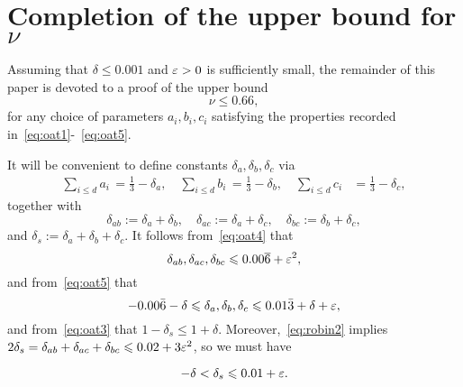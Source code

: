 \section{Completion of the upper bound for \texorpdfstring{$\nu$}{nu}}

Assuming that
 $\delta\leq 0.001$ and
$\varepsilon>0$ is sufficiently small,
the remainder of this paper is devoted to a proof of the upper bound
\[\nu \le 0.66,
\]
for any choice of parameters $a_i,b_i ,c_i$ satisfying the properties recorded in~\eqref{eq:oat1}-~\eqref{eq:oat5}.


It will be convenient to define constants $\delta_a,\delta_b,\delta_c$ via
\begin{align}\label{eq:ai1/3}
\sum_{i\leq d} a_i \, = \frac{1}{3}-\delta_a, \quad \sum_{i\leq d} b_i \, = \frac{1}{3}-\delta_b, \quad \sum_{i\leq d} c_i &= \frac{1}{3}-\delta_c,
\end{align}
together with
\[
\delta_{ab}:=\delta_a+\delta_b,\quad \delta_{ac}:=\delta_a+\delta_c, \quad \delta_{bc}:=\delta_b+\delta_c,
\]
and $\delta_s := \delta_a+\delta_b+\delta_c$. It follows from~\eqref{eq:oat4} that
\begin{equation}\label{eq:robin2}
\delta_{ab}, \delta_{ac}, \delta_{bc} \leqslant 0.00\overline{6} + \varepsilon^2,
\end{equation}
and from~\eqref{eq:oat5} that
\begin{equation}\label{eq:robin1}
-0.00\bar 6 - \delta
\leqslant \delta_a,\delta_b,\delta_c \leqslant
0.01\bar3+\delta+\varepsilon,
\end{equation}
and from~\eqref{eq:oat3} that
$
1-\delta_s\leq 1+\delta.
$
Moreover,~\eqref{eq:robin2} implies $2\delta_s = \delta_{ab}+ \delta_{ac}+ \delta_{bc}\leqslant 0.02 + 3\varepsilon^2$, so we must have
\begin{lemma}\label{lem:robin3}
  \begin{equation}\label{eq:robin3}
    -\delta <
    \delta_s \leqslant 0.01+\varepsilon.
    \end{equation}
\end{lemma}

